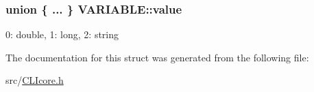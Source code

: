 \subsubsection[{value}]{\setlength{\rightskip}{0pt plus 5cm}union \{ ... \}   V\+A\+R\+I\+A\+B\+L\+E\+::value}\label{structVARIABLE_ac78c074d5d0c437357a205d97ee58c70}
0\+: double, 1\+: long, 2\+: string 

The documentation for this struct was generated from the following file\+:\begin{DoxyCompactItemize}
\item 
src/\hyperlink{CLIcore_8h}{C\+L\+Icore.\+h}\end{DoxyCompactItemize}
